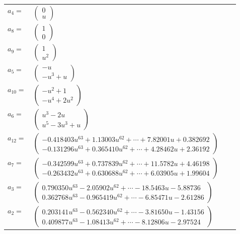 \documentclass[1p]{elsarticle_modified}
\theoremstyle{definition}
\begin{document}
\begin{tabular}{m{7pt} m{180pt} m{7pt} m{180pt} }
\flushright $a_{4}=$&$\begin{pmatrix}0\\u\end{pmatrix}$ \\
\flushright $a_{8}=$&$\begin{pmatrix}1\\0\end{pmatrix}$ \\
\flushright $a_{9}=$&$\begin{pmatrix}1\\u^2\end{pmatrix}$ \\
\flushright $a_{5}=$&$\begin{pmatrix}- u\\- u^3+u\end{pmatrix}$ \\
\flushright $a_{10}=$&$\begin{pmatrix}- u^2+1\\- u^4+2 u^2\end{pmatrix}$ \\
\flushright $a_{6}=$&$\begin{pmatrix}u^3-2 u\\u^5-3 u^3+u\end{pmatrix}$ \\
\flushright $a_{12}=$&$\begin{pmatrix}-0.418403 u^{63}+1.13003 u^{62}+\cdots+7.82001 u+0.382692\\-0.131296 u^{63}+0.365410 u^{62}+\cdots+4.28462 u+2.36192\end{pmatrix}$ \\
\flushright $a_{7}=$&$\begin{pmatrix}-0.342599 u^{63}+0.737839 u^{62}+\cdots+11.5782 u+4.46198\\-0.263432 u^{63}+0.630688 u^{62}+\cdots+6.03905 u+1.99604\end{pmatrix}$ \\
\flushright $a_{3}=$&$\begin{pmatrix}0.790350 u^{63}-2.05902 u^{62}+\cdots-18.5463 u-5.88736\\0.362768 u^{63}-0.965419 u^{62}+\cdots-6.85471 u-2.61286\end{pmatrix}$ \\
\flushright $a_{2}=$&$\begin{pmatrix}0.203141 u^{63}-0.562340 u^{62}+\cdots-3.81650 u-1.43156\\0.409877 u^{63}-1.08413 u^{62}+\cdots-8.12806 u-2.97524\end{pmatrix}$ \\

\end{tabular}
\end{document}

